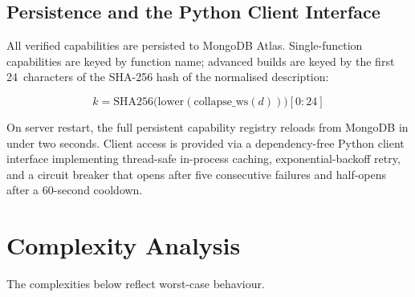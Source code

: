\documentclass[conference]{IEEEtran}
\begin{document}
\subsection{Persistence and the Python Client Interface}
\label{subsec:persistence}

All verified capabilities are persisted to MongoDB Atlas.
Single-function capabilities are keyed by function name; advanced builds
are keyed by the first 24~characters of the SHA-256 hash of the normalised
description:

\begin{equation}
k = \text{SHA256}\bigl(\text{lower}(\text{collapse\_ws}(d))\bigr)[0:24]
\label{eq:key}
\end{equation}

On server restart, the full persistent capability registry reloads from
MongoDB in under two seconds.
Client access is provided via a dependency-free Python client interface
implementing thread-safe in-process caching, exponential-backoff retry,
and a circuit breaker that opens after five consecutive failures and
half-opens after a 60-second cooldown.

\section{Complexity Analysis}
\label{sec:complexity}

The complexities below reflect worst-case behaviour.
\end{document}

